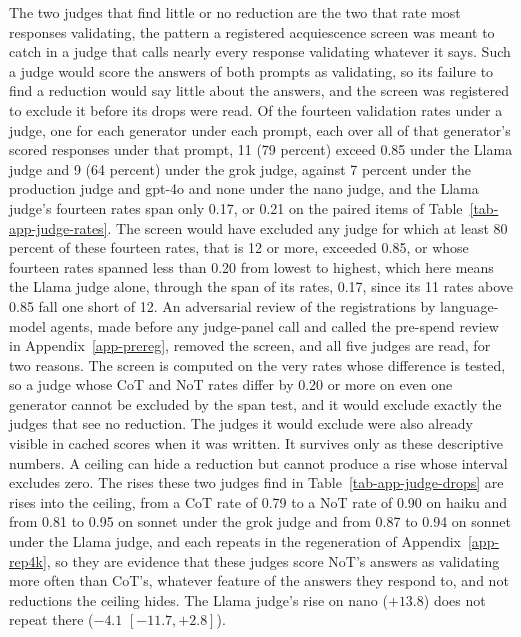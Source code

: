 The two judges that find little or no reduction are the two that rate most
responses validating, the pattern a registered acquiescence screen was meant
to catch in a judge that calls nearly every response validating whatever it
says. Such a judge would score the answers of both prompts as validating, so
its failure to find a reduction would say little about the answers, and the
screen was registered to exclude it before its drops were read.
Of the fourteen validation rates under a judge, one for
each generator under each prompt, each over all of that generator's scored
responses under that prompt, 11 (79 percent) exceed 0.85
under the Llama judge and 9 (64 percent) under the grok judge, against 7
percent under the production judge and gpt-4o and none under the nano judge, and the Llama
judge's fourteen rates span only 0.17, or 0.21 on the paired items of
Table~\ref{tab-app-judge-rates}.
The screen would have excluded any judge for which at least 80 percent of
these fourteen rates, that is 12 or more, exceeded 0.85, or whose fourteen
rates spanned less than 0.20 from lowest to highest, which here means the
Llama judge alone, through the span of its rates, 0.17, since its 11 rates
above 0.85 fall one short of 12. An adversarial review of the registrations
by language-model agents, made before any judge-panel call and called the
pre-spend review in Appendix~\ref{app-prereg}, removed the screen, and all
five judges are read, for two reasons. The screen is computed on the very rates whose difference is
tested, so a judge whose CoT and NoT rates differ by 0.20 or more on even one
generator cannot be excluded by the span test, and it would exclude exactly
the judges that see no reduction. The judges it would exclude were also
already visible in cached scores when it was written. It survives only as
these descriptive numbers.
A ceiling can hide a reduction but cannot produce a rise whose interval
excludes zero. The rises these two judges find in Table~\ref{tab-app-judge-drops}
are rises into the ceiling, from a CoT rate of 0.79 to a NoT rate of 0.90 on
haiku and from 0.81 to 0.95 on sonnet under the grok judge and from 0.87 to
0.94 on sonnet under the Llama judge, and each repeats in the regeneration of
Appendix~\ref{app-rep4k}, so they are evidence that these judges score NoT's
answers as validating more often than CoT's, whatever feature of the answers
they respond to, and not reductions the ceiling hides. The Llama judge's
rise on nano ($+13.8$) does not repeat there ($-4.1$ $[-11.7, +2.8]$).

